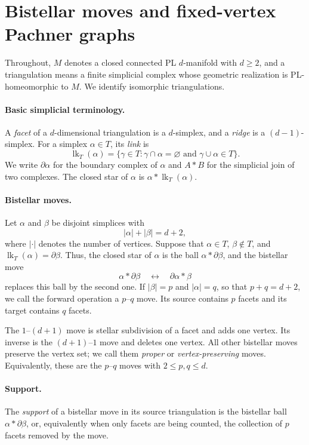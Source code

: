 \documentclass[11pt]{article}
\theoremstyle{remark}
\theoremstyle{plain}
\begin{document}
\section{Bistellar moves and fixed-vertex Pachner graphs}
\label{sec:definitions}

Throughout, \(M\) denotes a closed connected PL \(d\)-manifold with
\(d\ge2\), and a triangulation means a finite simplicial complex whose
geometric realization is PL-homeomorphic to \(M\).  We identify isomorphic
triangulations.

\paragraph{Basic simplicial terminology.}
A \emph{facet} of a \(d\)-dimensional triangulation is a \(d\)-simplex, and a
\emph{ridge} is a \((d-1)\)-simplex.  For a simplex \(\alpha\in T\), its
\emph{link} is
\[
 \operatorname{lk}_T(\alpha)
 =\{\gamma\in T:\gamma\cap\alpha=\varnothing
   \text{ and }\gamma\cup\alpha\in T\}.
\]
We write \(\partial\alpha\) for the boundary complex of \(\alpha\) and
\(A*B\) for the simplicial join of two complexes.  The closed star of
\(\alpha\) is \(\alpha*\operatorname{lk}_T(\alpha)\).

\paragraph{Bistellar moves.}
Let \(\alpha\) and \(\beta\) be disjoint simplices with
\[
 |\alpha|+|\beta|=d+2,
\]
where \(|\cdot|\) denotes the number of vertices.  Suppose that
\(\alpha\in T\), \(\beta\notin T\), and
\(\operatorname{lk}_T(\alpha)=\partial\beta\).  Thus, the closed star of
\(\alpha\) is the ball \(\alpha*\partial\beta\), and the bistellar move
\[
 \alpha*\partial\beta
 \quad\longleftrightarrow\quad
 \partial\alpha*\beta
\]
replaces this ball by the second one.  If \(|\beta|=p\) and
\(|\alpha|=q\), so that \(p+q=d+2\), we call the forward operation a
\(p\)--\(q\) move.  Its source contains \(p\) facets and its target contains
\(q\) facets.

The \(1\)--\((d+1)\) move is stellar subdivision of a facet and adds one
vertex.  Its inverse is the \((d+1)\)--\(1\) move and deletes one vertex.
All other bistellar moves preserve the vertex set; we call them
\emph{proper} or \emph{vertex-preserving} moves.  Equivalently, these are the
\(p\)--\(q\) moves with \(2\le p,q\le d\).

\paragraph{Support.}
The \emph{support} of a bistellar move in its source triangulation is the
bistellar ball \(\alpha*\partial\beta\), or, equivalently when only facets
are being counted, the collection of \(p\) facets removed by the move.
\end{document}

